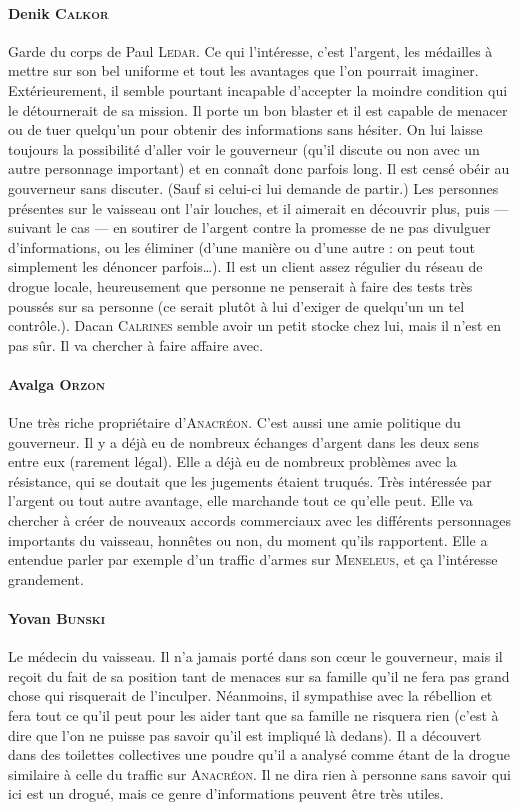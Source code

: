 \documentclass{article}
\begin{document}
{\paragraph{Denik \textsc{Calkor}}
{
Garde du corps de Paul \textsc{Ledar}.
Ce qui l’intéresse, c’est l’argent, les médailles à mettre sur son bel uniforme et tout les avantages que l’on pourrait imaginer.
Extérieurement, il semble pourtant incapable d’accepter la moindre condition qui le détournerait de sa mission.
Il porte un bon blaster et il est capable de menacer ou de tuer quelqu’un pour obtenir des informations sans hésiter.
On lui laisse toujours la possibilité d’aller voir le gouverneur (qu’il discute ou non avec un autre personnage important) et en connaît donc parfois long.
Il est censé obéir au gouverneur sans discuter. (Sauf si celui-ci lui demande de partir.)
Les personnes présentes sur le vaisseau ont l’air louches, et il aimerait en découvrir plus, puis — suivant le cas — en soutirer de l’argent contre la promesse de ne pas divulguer d’informations, ou les éliminer (d’une manière ou d’une autre : on peut tout simplement les dénoncer parfois\ldots).
Il est un client assez régulier du réseau de drogue locale, heureusement que personne ne penserait à faire des tests très poussés sur sa personne (ce serait plutôt à lui d’exiger de quelqu’un un tel contrôle.).
Dacan \textsc{Calrines} semble avoir un petit stocke chez lui, mais il n’est en pas sûr.
Il va chercher à faire affaire avec.
}

\paragraph{Avalga \textsc{Orzon}}
{
Une très riche propriétaire d’\textsc{Anacréon}.
C’est aussi une amie politique du gouverneur.
Il y a déjà eu de nombreux échanges d’argent dans les deux sens entre eux (rarement légal).
Elle a déjà eu de nombreux problèmes avec la résistance, qui se doutait que les jugements étaient truqués.
Très intéressée par l’argent ou tout autre avantage, elle marchande tout ce qu’elle peut.
Elle va chercher à créer de nouveaux accords commerciaux avec les différents personnages importants du vaisseau, honnêtes ou non, du moment qu’ils rapportent.
Elle a entendue parler par exemple d’un traffic d’armes sur \textsc{Meneleus}, et ça l’intéresse grandement.
}

\paragraph{Yovan \textsc{Bunski}}
{
Le médecin du vaisseau.
Il n’a jamais porté dans son cœur le gouverneur, mais il reçoit du fait de sa position tant de menaces sur sa famille qu’il ne fera pas grand chose qui risquerait de l’inculper.
Néanmoins, il sympathise avec la rébellion et fera tout ce qu’il peut pour les aider tant que sa famille ne risquera rien (c’est à dire que l’on ne puisse pas savoir qu’il est impliqué là dedans).
Il a découvert dans des toilettes collectives une poudre qu’il a analysé comme étant de la drogue similaire à celle du traffic sur \textsc{Anacréon}.
Il ne dira rien à personne sans savoir qui ici est un drogué, mais ce genre d’informations peuvent être très utiles.
}

}
\end{document}
